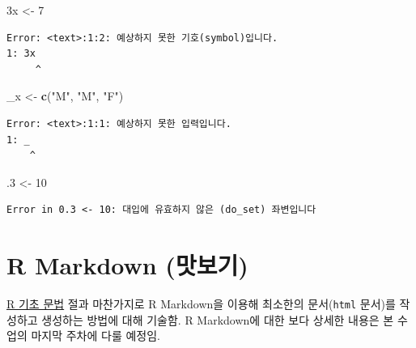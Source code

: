 \documentclass[
  11pt,
]{krantz}
\makeatletter
\newenvironment{Shaded}{\begin{snugshade}}{\end{snugshade}}
\newcommand{\DecValTok}[1]{\textcolor[rgb]{0.06,0.06,0.06}{#1}}
\newcommand{\FloatTok}[1]{\textcolor[rgb]{0.06,0.06,0.06}{#1}}
\newcommand{\KeywordTok}[1]{\textcolor[rgb]{0.27,0.27,0.27}{\textbf{#1}}}
\newcommand{\NormalTok}[1]{#1}
\newcommand{\StringTok}[1]{\textcolor[rgb]{0.5,0.5,0.5}{#1}}
\newenvironment{kframe}{%
\medskip{}
\setlength{\fboxsep}{.8em}
 \def\at@end@of@kframe{}%
 \ifinner\ifhmode%
  \def\at@end@of@kframe{\end{minipage}}%
  \begin{minipage}{\columnwidth}%
 \fi\fi%
 \def\FrameCommand##1{\hskip\@totalleftmargin \hskip-\fboxsep
 \colorbox{shadecolor}{##1}\hskip-\fboxsep
     \hskip-\linewidth \hskip-\@totalleftmargin \hskip\columnwidth}%
 \MakeFramed {\advance\hsize-\width
   \@totalleftmargin\z@ \linewidth\hsize
   \@setminipage}}%
 {\par\unskip\endMakeFramed%
 \at@end@of@kframe}
\newenvironment{rmdblock}[1]
  {
  \begin{itemize}
  \renewcommand{\labelitemi}{
    \raisebox{-.7\height}[0pt][0pt]{
      {\setkeys{Gin}{width=3em,keepaspectratio}\texttt{[image: images/\#1]}}
    }
  }
  \setlength{\fboxsep}{1em}
  \begin{kframe}
  \item
  }
  {
  \end{kframe}
  \end{itemize}
  }
\newenvironment{rmdnote}
  {\begin{rmdblock}{note}}
  {\end{rmdblock}}
\makeatother
\begin{document}
\begin{Shaded}
\begin{Highlighting}[]
\NormalTok{3x <-}\StringTok{ }\DecValTok{7}
\end{Highlighting}
\end{Shaded}

\begin{verbatim}
Error: <text>:1:2: 예상하지 못한 기호(symbol)입니다.
1: 3x
     ^
\end{verbatim}

\normalsize

\footnotesize

\begin{Shaded}
\begin{Highlighting}[]
\NormalTok{_x <-}\StringTok{ }\KeywordTok{c}\NormalTok{(}\StringTok{"M"}\NormalTok{, }\StringTok{"M"}\NormalTok{, }\StringTok{"F"}\NormalTok{)}
\end{Highlighting}
\end{Shaded}

\begin{verbatim}
Error: <text>:1:1: 예상하지 못한 입력입니다.
1: _
    ^
\end{verbatim}

\normalsize

\footnotesize

\begin{Shaded}
\begin{Highlighting}[]
\FloatTok{.3}\NormalTok{ <-}\StringTok{ }\DecValTok{10}
\end{Highlighting}
\end{Shaded}

\begin{verbatim}
Error in 0.3 <- 10: 대입에 유효하지 않은 (do_set) 좌변입니다
\end{verbatim}

\normalsize

\hypertarget{r-markdown-get-start}{%
\section{R Markdown (맛보기)}\label{r-markdown-get-start}}

\footnotesize

\begin{rmdnote}
\begin{rmdnote}

\protect\hyperlink{r-basic}{R 기초 문법} 절과 마찬가지로 R Markdown을 이용해 최소한의 문서(\texttt{html} 문서)를 작성하고 생성하는 방법에 대해 기술함. R Markdown에 대한 보다 상세한 내용은 본 수업의 마지막 주차에 다룰 예정임.

\end{rmdnote}
\end{rmdnote}
\end{document}
